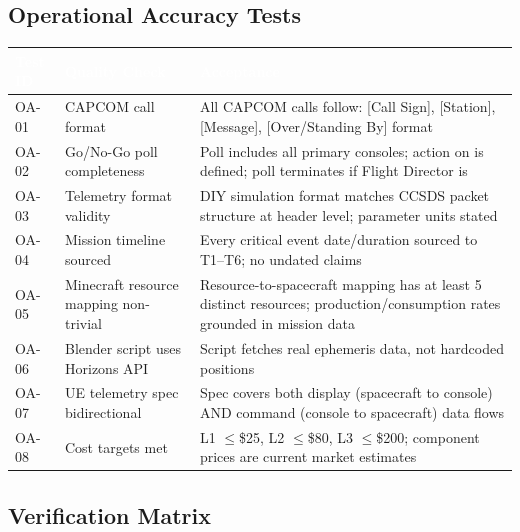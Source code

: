 \documentclass[11pt,letterpaper]{article}
\newcommand{\nogo}{\textcolor{alert}{\textbf{\sffamily[NO-GO]}}}
\newcommand{\tableheader}[1]{\textbf{\sffamily\textcolor{white}{#1}}}
\begin{document}
\subsection{Operational Accuracy Tests}

\begin{center}
\begin{tabularx}{\textwidth}{L{1.5cm}L{4cm}X}
\toprule
{}
\tableheader{Test ID} & \tableheader{Quality Check} & \tableheader{Acceptance} \\
\midrule
OA-01 & CAPCOM call format & All CAPCOM calls follow: [Call Sign], [Station], [Message], [Over/Standing By] format \\
OA-02 & Go/No-Go poll completeness & Poll includes all primary consoles; action on \nogo{} is defined; poll terminates if Flight Director is \nogo{} \\
OA-03 & Telemetry format validity & DIY simulation format matches CCSDS packet structure at header level; parameter units stated \\
OA-04 & Mission timeline sourced & Every critical event date/duration sourced to T1--T6; no undated claims \\
OA-05 & Minecraft resource mapping non-trivial & Resource-to-spacecraft mapping has at least 5 distinct resources; production/consumption rates grounded in mission data \\
OA-06 & Blender script uses Horizons API & Script fetches real ephemeris data, not hardcoded positions \\
OA-07 & UE telemetry spec bidirectional & Spec covers both display (spacecraft to console) AND command (console to spacecraft) data flows \\
OA-08 & Cost targets met & L1 $\leq$\$25, L2 $\leq$\$80, L3 $\leq$\$200; component prices are current market estimates \\
\bottomrule
\end{tabularx}
\end{center}

\subsection{Verification Matrix}
\end{document}
